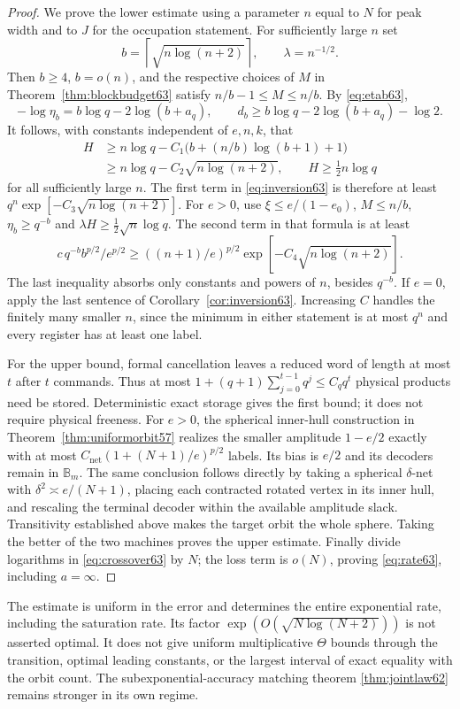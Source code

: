 \begin{proof}
We prove the lower estimate using a parameter $n$ equal to $N$ for
peak width and to $J$ for the occupation statement. For sufficiently
large $n$ set
\[
 b=\left\lceil\sqrt{n\log(n+2)}\right\rceil,\qquad
 \lambda=n^{-1/2}.
\]
Then $b\ge4$, $b=o(n)$, and the respective choices of $M$ in
Theorem~\ref{thm:blockbudget63} satisfy $n/b-1\le M\le n/b$.
By \eqref{eq:etab63},
\[
 -\log\eta_b=b\log q-2\log(b+a_q),\qquad
 d_b\ge b\log q-2\log(b+a_q)-\log2.
\]
It follows, with constants independent of $e,n,k$, that
\begin{align*}
 H&\ge n\log q-C_1\bigl(b+(n/b)\log(b+1)+1\bigr)\\
  &\ge n\log q-C_2\sqrt{n\log(n+2)},
 \qquad H\ge\tfrac12 n\log q
\end{align*}
for all sufficiently large $n$. The first term in
\eqref{eq:inversion63} is therefore at least
$q^n\exp[-C_3\sqrt{n\log(n+2)}]$.
For $e>0$, use $\xi\le e/(1-e_0)$, $M\le n/b$,
$\eta_b\ge q^{-b}$ and $\lambda H\ge\frac12\sqrt n\log q$.
The second term in that formula is at least
\[
 c\,q^{-b}b^{p/2}/e^{p/2}
 \ge ((n+1)/e)^{p/2}
       \exp[-C_4\sqrt{n\log(n+2)}].
\]
The last inequality absorbs only constants and powers of $n$, besides
$q^{-b}$. If $e=0$, apply the last sentence of
Corollary~\ref{cor:inversion63}. Increasing $C$ handles the finitely
many smaller $n$, since the minimum in either statement is at most
$q^n$ and every register has at least one label.

For the upper bound, formal cancellation leaves a reduced word of
length at most $t$ after $t$ commands. Thus at most
$1+(q+1)\sum_{j=0}^{t-1}q^j\le C_q q^t$ physical products need be
stored. Deterministic exact storage gives the first bound; it does not
require physical freeness. For $e>0$, the spherical inner-hull
construction in Theorem~\ref{thm:uniformorbit57} realizes the smaller
amplitude $1-e/2$ exactly with at most
$C_{\mathrm{net}}(1+(N+1)/e)^{p/2}$ labels. Its bias is $e/2$ and its decoders
remain in $\mathbb B_m$. The same conclusion follows directly by taking a
spherical $\delta$-net with $\delta^2\asymp e/(N+1)$, placing each
contracted rotated vertex in its inner hull, and rescaling the terminal
decoder within the available amplitude slack. Transitivity established
above makes the target orbit the whole sphere. Taking the better of
the two machines proves the upper estimate. Finally divide logarithms
in \eqref{eq:crossover63} by $N$; the loss term is $o(N)$, proving
\eqref{eq:rate63}, including $a=\infty$.
\end{proof}
\begin{remark}\label{rem:rateboundary63}
The estimate is uniform in the error and determines the entire
exponential rate, including the saturation rate. Its factor
$\exp(O(\sqrt{N\log(N+2)}))$ is not asserted optimal. It does not
give uniform multiplicative $\Theta$ bounds through the transition,
optimal leading constants, or the largest interval of exact equality
with the orbit count. The subexponential-accuracy matching theorem
\ref{thm:jointlaw62} remains stronger in its own regime.
\end{remark}


